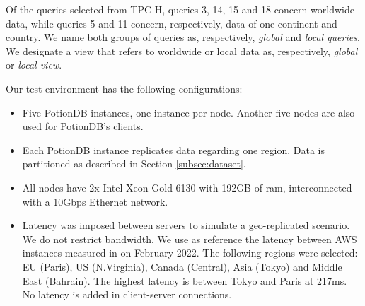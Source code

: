 \documentclass[sigplan,review,anonymous]{acmart}
\newcommand{\andre}[1]{\nbnote{Andre}{blue}{#1}}
\begin{document}
Of the queries selected from TPC-H, queries 3, 14, 15 and 18 concern worldwide data, while queries 5 and 11 concern, respectively, data of one continent and country.
We name both groups of queries as, respectively, \textit{global} and \textit{local queries}.
We designate a view that refers to worldwide or local data as, respectively, \textit{global} or \textit{local view}.

Our test environment has the following configurations:

\begin{itemize}
	\item Five PotionDB instances, one instance per node.
	Another five nodes are also used for PotionDB's clients.
	\item Each PotionDB instance replicates data regarding one region. Data is partitioned as described in Section \ref{subsec:dataset}. 
	\item All nodes have 2x Intel Xeon Gold 6130 with 192GB of ram, interconnected with a 10Gbps Ethernet network. %
	\item Latency was imposed between servers to simulate a geo-replicated scenario.
	We do not restrict bandwidth. %
	We use as reference the latency between AWS instances measured in \cite{AWSLatency} on February 2022.
	The following regions were selected: EU (Paris), US (N.Virginia), Canada (Central), Asia (Tokyo) and Middle East (Bahrain). The highest latency is between Tokyo and Paris at 217ms.
	No latency is added in client-server connections. %

\end{itemize}
\end{document}
